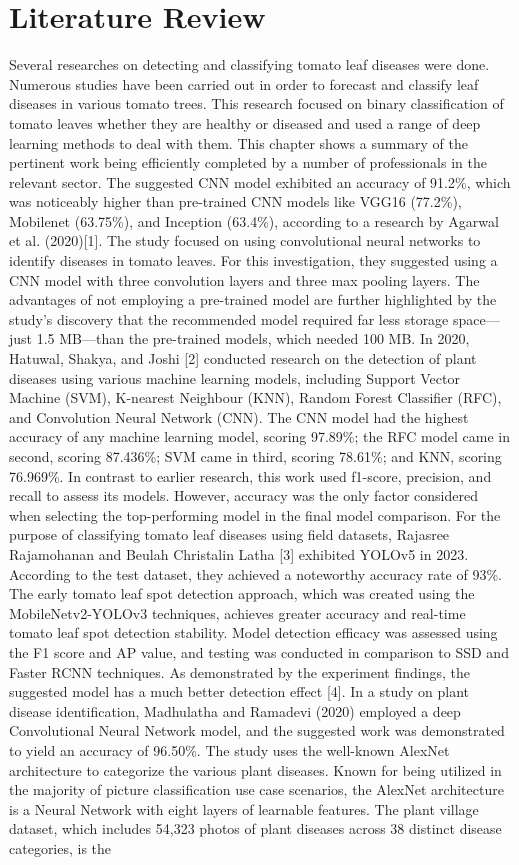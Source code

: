 \section{Literature Review}
Several researches on detecting and classifying tomato leaf diseases were done. Numerous studies have been carried out in order to forecast and classify leaf diseases in various tomato trees. This research focused on binary classification of tomato leaves whether they are healthy or diseased and used a range of deep learning methods to deal with them. This chapter shows a summary of the pertinent work being efficiently completed by a number of professionals in the relevant sector. The suggested CNN model exhibited an accuracy of 91.2\%, which was noticeably higher than pre-trained CNN models like VGG16 (77.2\%), Mobilenet (63.75\%), and Inception (63.4\%), according to a research by Agarwal et al. (2020)[1]. The study focused on using convolutional neural networks to identify diseases in tomato leaves. For this investigation, they suggested using a CNN model with three convolution layers and three max pooling layers. The advantages of not employing a pre-trained model are further highlighted by the study's discovery that the recommended model required far less storage space—just 1.5 MB—than the pre-trained models, which needed 100 MB. In 2020, Hatuwal, Shakya, and Joshi [2] conducted research on the detection of plant diseases using various machine learning models, including Support Vector Machine (SVM), K-nearest Neighbour (KNN), Random Forest Classifier (RFC), and Convolution Neural Network (CNN). The CNN model had the highest accuracy of any machine learning model, scoring 97.89\%; the RFC model came in second, scoring 87.436\%; SVM came in third, scoring 78.61\%; and KNN, scoring 76.969\%. In contrast to earlier research, this work used f1-score, precision, and recall to assess its models. However, accuracy was the only factor considered when selecting the top-performing model in the final model comparison. For the purpose of classifying tomato leaf diseases using field datasets, Rajasree Rajamohanan and Beulah Christalin Latha [3] exhibited YOLOv5 in 2023. According to the test dataset, they achieved a noteworthy accuracy rate of 93\%. The early tomato leaf spot detection approach, which was created using the MobileNetv2-YOLOv3 techniques, achieves greater accuracy and real-time tomato leaf spot detection stability. Model detection efficacy was assessed using the F1 score and AP value, and testing was conducted in comparison to SSD and Faster RCNN techniques. As demonstrated by the experiment findings, the suggested model has a much better detection effect [4]. In a study on plant disease identification, Madhulatha and Ramadevi (2020) employed a deep Convolutional Neural Network model, and the suggested work was demonstrated to yield an accuracy of 96.50\%. The study uses the well-known AlexNet architecture to categorize the various plant diseases. Known for being utilized in the majority of picture classification use case scenarios, the AlexNet architecture is a Neural Network with eight layers of learnable features. The plant village dataset, which includes 54,323 photos of plant diseases across 38 distinct disease categories, is the 